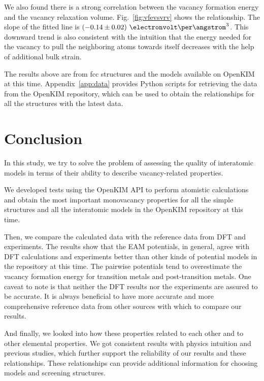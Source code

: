 \documentclass[%
 reprint,
 nofootinbib,
 amsmath,amssymb,
 aps,
]{revtex4-1}
\begin{document}
We also found there is a strong correlation between the vacancy formation energy and the vacancy relaxation volume.
Fig.~\ref{fig:vfevsvrv} shows the relationship.
The slope of the fitted line is $(-0.14\pm0.02)~\electronvolt\per\angstrom^3$.
This downward trend is also consistent with the intuition that the energy needed for the vacancy to pull the neighboring atoms towards itself decreases with the help of additional bulk strain.

The results above are from fcc structures and the models available on OpenKIM at this time.
Appendix~\ref{app:data} provides Python scripts for retrieving the data from the OpenKIM repository, which can be used to obtain the relationships for all the structures with the latest data.

\section{\label{sec:conclusion}Conclusion}

In this study, we try to solve the problem of assessing the quality of interatomic models in terms of their ability to describe vacancy-related properties.

We developed tests using the OpenKIM API to perform atomistic calculations and obtain the most important monovacancy properties for all the simple structures and all the interatomic models in the OpenKIM repository at this time.

Then, we compare the calculated data with the reference data from DFT and experiments.
The results show that the EAM potentials, in general, agree with DFT calculations and experiments better than other kinds of potential models in the repository at this time.
The pairwise potentials tend to overestimate the vacancy formation energy for transition metals and post-transition metals.
One caveat to note is that neither the DFT results nor the experiments are assured to be accurate.
It is always beneficial to have more accurate and more comprehensive reference data from other sources with which to compare our results.

And finally, we looked into how these properties related to each other and to other elemental properties.
We got consistent results with physics intuition and previous studies, which further support the reliability of our results and these relationships.
These relationships can provide additional information for choosing models and screening structures.

%
\end{document}
